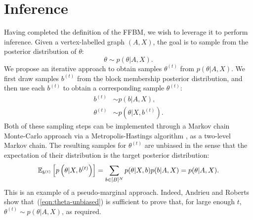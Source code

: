\section{Inference}
\label{sec:inference}

Having completed the definition of the FFBM, we wish to leverage it 
to perform inference. Given a vertex-labelled graph $(A, X)$,
the goal is to sample from the posterior distribution
of $\theta$:
%
\begin{equation}
	\label{eqn:theta-target}
	\theta \sim p(\theta | A, X).
\end{equation}
%
We propose an iterative approach to obtain samples
$\theta^{(t)}$ from $p(\theta|A,X)$. We first draw samples $b^{(t)}$ 
from the block membership posterior distribution,
and then use each $b^{(t)}$ to obtain a corresponding
sample $\theta^{(t)}$:
%
\begin{align}
	b^{(t)} &\sim p ( b | A, X )  \label{eqn:b-samples},\\
	\theta^{(t)} &\sim p\left(\theta | X, b^{(t)} \right). \label{eqn:theta-samples}
\end{align}
%
Both of these sampling steps can be implemented through a
Markov chain Monte-Carlo approach via a Metropolis-Hastings 
algorithm \cite{hastings-alg}, as a two-level Markov chain.
The resulting samples 
for $\theta^{(t)}$ are unbiased in the sense that the expectation of 
their distribution is the target posterior distribution:
%
\begin{equation}
\mathbb{E}_{b^{(t)}} \left[p \left( \theta | X, b^{(t)} \right) \right] = \sum_{b \in [B]^N} p(\theta | X, b) p(b | A, X) = p(\theta | A, X).
\label{eqn:theta-unbiased}
\end{equation}
%
This is an example of a pseudo-marginal approach. Indeed, Andrieu and Roberts \cite{pseudo-marginal} show that~(\ref{eqn:theta-unbiased})
is sufficient to prove that, for large enough $t$, $\theta^{(t)} \sim p(\theta | A, X)$, as required.

